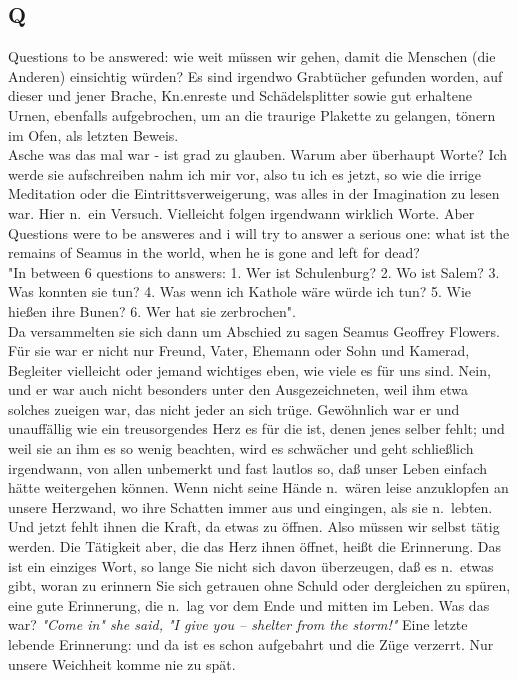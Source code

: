 \documentclass[
]{article}
\author{}
\date{\vspace{-2.5em}}
\begin{document}
\subsection{Q}\label{q}

Questions to be answered: wie weit müssen wir gehen, damit die Menschen
(die Anderen) einsichtig würden? Es sind irgendwo Grabtücher gefunden
worden, auf dieser und jener Brache, Kn.enreste und Schädelsplitter
sowie gut erhaltene Urnen, ebenfalls aufgebrochen, um an die traurige
Plakette zu gelangen, tönern im Ofen, als letzten Beweis.\\
Asche was das mal war - ist grad zu glauben. Warum aber überhaupt Worte?
Ich werde sie aufschreiben nahm ich mir vor, also tu ich es jetzt, so
wie die irrige Meditation oder die Eintrittsverweigerung, was alles in
der Imagination zu lesen war. Hier n.~ein Versuch. Vielleicht folgen
irgendwann wirklich Worte. Aber Questions were to be answeres and i will
try to answer a serious one: what ist the remains of Seamus in the
world, when he is gone and left for dead?\\
"In between 6 questions to answers: 1. Wer ist Schulenburg? 2. Wo ist
Salem? 3. Was konnten sie tun? 4. Was wenn ich Kathole wäre würde ich
tun? 5. Wie hießen ihre Bunen? 6. Wer hat sie zerbrochen".\\
Da versammelten sie sich dann um Abschied zu sagen Seamus Geoffrey
Flowers. Für sie war er nicht nur Freund, Vater, Ehemann oder Sohn und
Kamerad, Begleiter vielleicht oder jemand wichtiges eben, wie viele es
für uns sind. Nein, und er war auch nicht besonders unter den
Ausgezeichneten, weil ihm etwa solches zueigen war, das nicht jeder an
sich trüge. Gewöhnlich war er und unauffällig wie ein treusorgendes Herz
es für die ist, denen jenes selber fehlt; und weil sie an ihm es so
wenig beachten, wird es schwächer und geht schließlich irgendwann, von
allen unbemerkt und fast lautlos so, daß unser Leben einfach hätte
weitergehen können. Wenn nicht seine Hände n.~wären leise anzuklopfen an
unsere Herzwand, wo ihre Schatten immer aus und eingingen, als sie
n.~lebten. Und jetzt fehlt ihnen die Kraft, da etwas zu öffnen. Also
müssen wir selbst tätig werden. Die Tätigkeit aber, die das Herz ihnen
öffnet, heißt die Erinnerung. Das ist ein einziges Wort, so lange Sie
nicht sich davon überzeugen, daß es n.~etwas gibt, woran zu erinnern Sie
sich getrauen ohne Schuld oder dergleichen zu spüren, eine gute
Erinnerung, die n.~lag vor dem Ende und mitten im Leben. Was das war?
\emph{"Come in" she said, "I give you -- shelter from the storm!"} Eine
letzte lebende Erinnerung: und da ist es schon aufgebahrt und die Züge
verzerrt. Nur unsere Weichheit komme nie zu spät.
\end{document}
